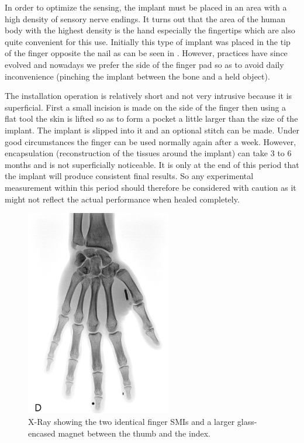 \documentclass[10pt,journal,compsoc]{IEEEtran}
\begin{document}
In order to optimize the sensing, the implant must be placed in an area with a high density of sensory nerve endings. It turns out that the area of the human body with the highest density is the hand especially the fingertips which are also quite convenient for this use. Initially this type of implant was placed in the tip of the finger opposite the nail as can be seen in \cite{hameed2010ieee}. However, practices have since evolved and nowadays we prefer the side of the finger pad so as to avoid daily inconvenience (pinching the implant between the bone and a held object).

The installation operation is relatively short and not very intrusive because it is superficial. First a small incision is made on the side of the finger then using a flat tool the skin is lifted so as to form a pocket a little larger than the size of the implant. The implant is slipped into it and an optional stitch can be made. Under good circumstances the finger can be used normally again after a week. However, encapsulation (reconstruction of the tissues around the implant) can take 3 to 6 months and is not superficially noticeable. It is only at the end of this period that the implant will produce consistent final results. So any experimental measurement within this period should therefore be considered with caution as it might not reflect the actual performance when healed completely.
			
			\begin{figure}[!t]
				\centering
 				\includegraphics[width=2.5in]{FullHandXrayNeg}
				\caption{X-Ray showing the two identical finger SMIs and a larger glass-encased magnet between the thumb and the index.}
				\label{FullHandXray}
			\end{figure}
			
\end{document}
